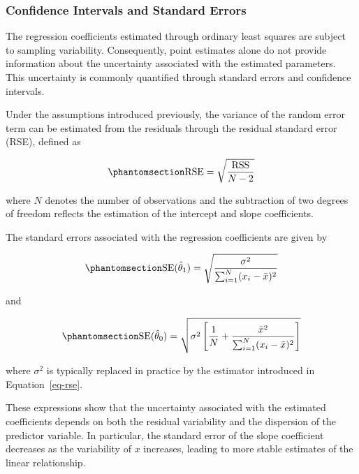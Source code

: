\documentclass[
  12pt,
  letterpaper,
]{book}
\begin{document}
\subsubsection{Confidence Intervals and Standard
Errors}\label{confidence-intervals-and-standard-errors}

The regression coefficients estimated through ordinary least squares are
subject to sampling variability. Consequently, point estimates alone do
not provide information about the uncertainty associated with the
estimated parameters. This uncertainty is commonly quantified through
standard errors and confidence intervals.

Under the assumptions introduced previously, the variance of the random
error term can be estimated from the residuals through the residual
standard error (RSE), defined as

\begin{equation}\phantomsection\label{eq-rse}{
\mathrm{RSE}
=
\sqrt{
\frac{
\mathrm{RSS}
}{
N - 2
}
}
}\end{equation}

where \(N\) denotes the number of observations and the subtraction of
two degrees of freedom reflects the estimation of the intercept and
slope coefficients.

The standard errors associated with the regression coefficients are
given by

\begin{equation}\phantomsection\label{eq-se-slope}{
\mathrm{SE}(\hat{\theta}_1)
=
\sqrt{
\frac{
\sigma^2
}{
\sum_{i=1}^{N}
(x_i - \bar{x})^2
}
}
}\end{equation}

and

\begin{equation}\phantomsection\label{eq-se-intercept}{
\mathrm{SE}(\hat{\theta}_0)
=
\sqrt{
\sigma^2
\left[
\frac{1}{N}
+
\frac{
\bar{x}^2
}{
\sum_{i=1}^{N}
(x_i - \bar{x})^2
}
\right]
}
}\end{equation}

where \(\sigma^2\) is typically replaced in practice by the estimator
introduced in Equation~\ref{eq-rse}.

These expressions show that the uncertainty associated with the
estimated coefficients depends on both the residual variability and the
dispersion of the predictor variable. In particular, the standard error
of the slope coefficient decreases as the variability of \(x\)
increases, leading to more stable estimates of the linear relationship.
\end{document}
